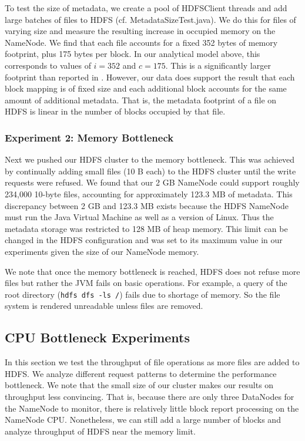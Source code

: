 \documentclass[11pt, a4paper]{article}
\begin{document}
\begin{multicols*}{2}
To test the size of metadata, we create a pool of HDFSClient threads and add large batches of files to HDFS (cf. MetadataSizeTest.java). We do this for files of varying size and measure the resulting increase in occupied memory on the NameNode. We find that each file accounts for a fixed 352 bytes of memory footprint, plus 175 bytes per block. In our analytical model above, this corresponds to values of $i = 352$ and $c = 175$. This is a significantly larger footprint than reported in \cite{HdfsScale}. However, our data does support the result that each block mapping is of fixed size and each additional block accounts for the same amount of additional metadata. That is, the metadata footprint of a file on HDFS is linear in the number of blocks occupied by that file.

\subsubsection{Experiment 2: Memory Bottleneck}\label{MemoryBottleneck}
Next we pushed our HDFS cluster to the memory bottleneck. This was achieved by continually adding small files (10 B each) to the HDFS cluster until the write requests were refused. We found that our 2 GB NameNode could support roughly 234,000 10-byte files, accounting for approximately 123.3 MB of metadata. This discrepancy between 2 GB and 123.3 MB exists because the HDFS NameNode must run the Java Virtual Machine as well as a version of Linux. Thus the metadata storage was restricted to 128 MB of heap memory. This limit can be changed in the HDFS configuration and was set to its maximum value in our experiments given the size of our NameNode memory.

We note that once the memory bottleneck is reached, HDFS does not refuse more files but rather the JVM fails on basic operations. For example, a query of the root directory (\texttt{hdfs dfs -ls /}) fails due to shortage of memory. So the file system is rendered unreadable unless files are removed.

\subsection{CPU Bottleneck Experiments}\label{CPUBottleneck}
In this section we test the throughput of file operations as more files are added to HDFS. We analyze different request patterns to determine the performance bottleneck. We note that the small size of our cluster makes our results on throughput less convincing. That is, because there are only three DataNodes for the NameNode to monitor, there is relatively little block report processing on the NameNode CPU. Nonetheless, we can still add a large number of blocks and analyze throughput of HDFS near the memory limit.

\end{multicols*}
\end{document}
